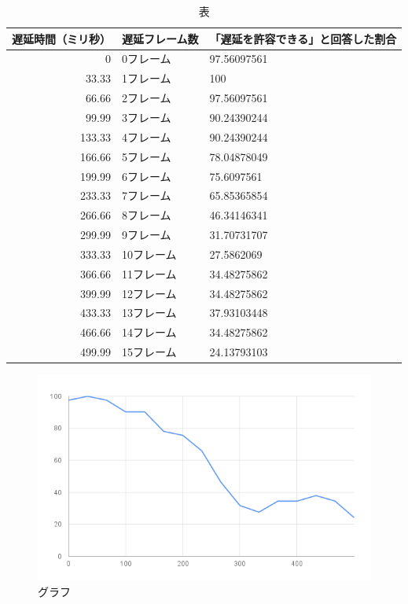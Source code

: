 \begin{table}[htbp]
  \caption{表}
  \label{tb:fpga-implement-modules}
  \begin{center}
  \begin{tabular}{r|l|l}
    \hline
    遅延時間（ミリ秒） & 遅延フレーム数 & 「遅延を許容できる」と回答した割合 \\\hline\hline
    0               & 0フレーム     & 97.56097561 \\\hline
    33.33           & 1フレーム     & 100         \\\hline
    66.66           & 2フレーム     & 97.56097561 \\\hline
    99.99           & 3フレーム     & 90.24390244 \\\hline
    133.33          & 4フレーム     & 90.24390244 \\\hline
    166.66          & 5フレーム     & 78.04878049 \\\hline
    199.99          & 6フレーム     & 75.6097561  \\\hline
    233.33          & 7フレーム     & 65.85365854 \\\hline
    266.66          & 8フレーム     & 46.34146341 \\\hline
    299.99          & 9フレーム     & 31.70731707 \\\hline
    333.33          & 10フレーム    & 27.5862069  \\\hline
    366.66          & 11フレーム    & 34.48275862 \\\hline
    399.99          & 12フレーム    & 34.48275862 \\\hline
    433.33          & 13フレーム    & 37.93103448 \\\hline
    466.66          & 14フレーム    & 34.48275862 \\\hline
    499.99          & 15フレーム    & 24.13793103 \\\hline
  \end{tabular}\end{center}
\end{table}


\begin{figure}[htbp]
  \begin{center}
    \includegraphics[bb=0 0 600 371,width=14cm]{img/mv-delay-result-graph.png}
  \end{center}
  \caption{グラフ}
  \label{fig:mv-delay-result-graph}
\end{figure}

